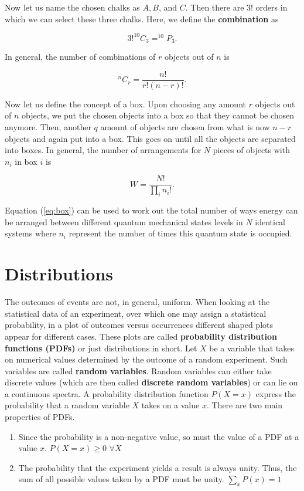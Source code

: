         Now let us name the chosen chalks as $A,B$, and $C$. Then there are $3!$ orders in which we can select these three chalks. Here, we define the \textbf{combination} as
        
        \begin{equation}
            3!^{10}C_3 = ^{10}P_3.
        \end{equation}
        
        In general, the number of combinations of $r$ objects out of $n$ is
        
        \begin{equation}
            ^nC_r=\frac{n!}{r!(n-r)!}.
        \end{equation}
        
        Now let us define the concept of a box. Upon choosing any amount $r$ objects out of $n$ objects, we put the chosen objects into a box so that they cannot be chosen anymore. Then, another $q$ amount of objects are chosen from what is now $n-r$ objects and again put into a box. This goes on until all the objects are separated into boxes. In general, the number of arrangements for $N$ pieces of objects with $n_i$ in box $i$ is 
        
        \begin{equation}
            W = \frac{N!}{\prod_in_i!}.
            \label{eq:box}
        \end{equation}
        
        Equation (\ref{eq:box}) can be used to work out the total number of ways energy can be arranged between different quantum mechanical states levels in $N$ identical systems where $n_i$ represent the number of times this quantum state is occupied.
    \section{Distributions}
        The outcomes of events are not, in general, uniform. When looking at the statistical data of an experiment, over which one may assign a statistical probability, in a plot of outcomes versus occurrences different shaped plots appear for different cases. These plots are called \textbf{probability distribution functions (PDFs)} or just distributions in short. Let $X$ be a variable that takes on numerical values determined by the outcome of a random experiment. Such variables are called \textbf{random variables}. Random variables can either take discrete values (which are then called \textbf{discrete random variables}) or can lie on a continuous spectra. A probability distribution function $P(X=x)$ express the probability that a random variable $X$ takes on a value $x$. There are two main properties of PDFs.
        \begin{enumerate}
            \item Since the probability is a non-negative value, so must the value of a PDF at a value $x$. \(P(X=x) \geq 0\) \( \forall X\)
            \item The probability that the experiment yields a result is always unity. Thus, the sum of all possible values taken by a PDF must be unity. \(\sum_xP(x)=1\)
        \end{enumerate}

